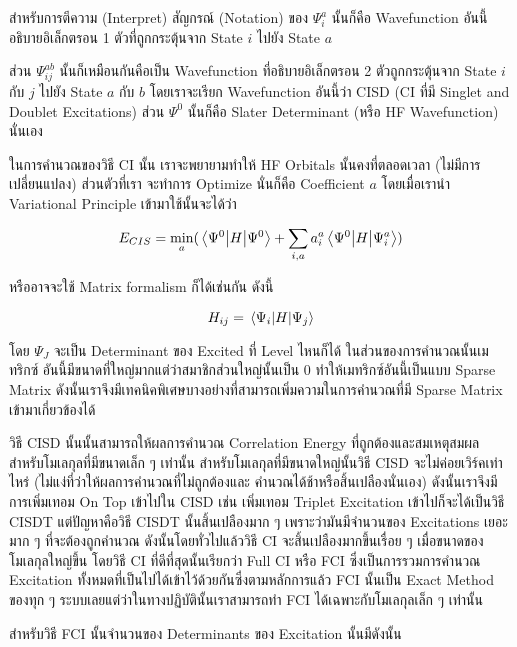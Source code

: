 สำหรับการตีความ (Interpret) สัญกรณ์ (Notation) ของ $\Psi^{a}_{i}$ นั้นก็คือ Wavefunction 
อันนี้อธิบายอิเล็กตรอน 1 ตัวที่ถูกกระตุ้นจาก State $i$ ไปยัง State $a$

ส่วน $\Psi^{ab}_{ij}$ นั้นก็เหมือนกันคือเป็น Wavefunction ที่อธิบายอิเล็กตรอน 2 ตัวถูกกระตุ้นจาก
State $i$ กับ $j$ ไปยัง State $a$ กับ $b$ โดยเราจะเรียก Wavefunction อันนี้ว่า CISD (CI ที่มี Singlet
and Doublet Excitations) ส่วน $\Psi^{0}$ นั้นก็คือ Slater Determinant (หรือ HF Wavefunction)
นั่นเอง

ในการคำนวณของวิธี CI นั้น เราจะพยายามทำให้ HF Orbitals นั้นคงที่ตลอดเวลา (ไม่มีการเปลี่ยนแปลง) ส่วนตัวที่เรา%
จะทำการ Optimize นั่นก็คือ Coefficient $a$ โดยเมื่อเรานำ Variational Principle เข้ามาใช้นั้นจะได้ว่า

\begin{equation}
    E_{CIS} = \min_{a} ( \mel{\Psi^{0}}{H}{\Psi^{0}}
    + \sum_{i,a} a^{a}_{i} \mel{\Psi^{0}}{H}{\Psi^{a}_{i}} )
\end{equation}

\noindent หรืออาจจะใช้ Matrix formalism ก็ได้เช่นกัน ดังนี้

\begin{equation}
    H_{ij} = \mel{\Psi_{i}}{H}{\Psi_{j}}
\end{equation}

โดย $\Psi_{J}$ จะเป็น Determinant ของ Excited ที่ Level ไหนก็ได้ ในส่วนของการคำนวณนั้นเมทริกซ์%
อันนี้มีขนาดที่ใหญ่มากแต่ว่าสมาชิกส่วนใหญ่นั้นเป็น 0 ทำให้เมทริกซ์อันนี้เป็นแบบ Sparse Matrix
ดังนั้นเราจึงมีเทคนิคพิเศษบางอย่างที่สามารถเพิ่มความในการคำนวณที่มี Sparse Matrix เข้ามาเกี่ยวข้องได้

วิธี CISD นั้นนั้นสามารถให้ผลการคำนวณ Correlation Energy ที่ถูกต้องและสมเหตุสมผลสำหรับโมเลกุลที่มีขนาดเล็ก ๆ
เท่านั้น สำหรับโมเลกุลที่มีขนาดใหญ่นั้นวิธี CISD จะไม่ค่อยเวิร์คเท่าไหร่ (ไม่แง่ที่ว่าให้ผลการคำนวณที่ไม่ถูกต้องและ%
คำนวณได้ช้าหรือสิ้นเปลืองนั่นเอง) ดังนั้นเราจึงมีการเพิ่มเทอม On Top เข้าไปใน CISD เช่น เพิ่มเทอม Triplet
Excitation เข้าไปก็จะได้เป็นวิธี CISDT แต่ปัญหาคือวิธี CISDT นั้นสิ้นเปลืองมาก ๆ เพราะว่ามันมีจำนวนของ
Excitations เยอะมาก ๆ ที่จะต้องถูกคำนวณ ดังนั้นโดยทั่วไปแล้ววิธี CI จะสิ้นเปลืองมากขึ้นเรื่อย ๆ
เมื่อขนาดของโมเลกุลใหญ่ขึ้น โดยวิธี CI ที่ดีที่สุดนั้นเรียกว่า Full CI หรือ FCI ซึ่งเป็นการรวมการคำนวณ
Excitation ทั้งหมดที่เป็นไปได้เข้าไว้ด้วยกันซึ่งตามหลักการแล้ว FCI นั้นเป็น Exact Method ของทุก ๆ
ระบบเลยแต่ว่าในทางปฏิบัตินั้นเราสามารถทำ FCI ได้เฉพาะกับโมเลกุลเล็ก ๆ เท่านั้น

สำหรับวิธี FCI นั้นจำนวนของ Determinants ของ Excitation นั้นมีดังนั้น


